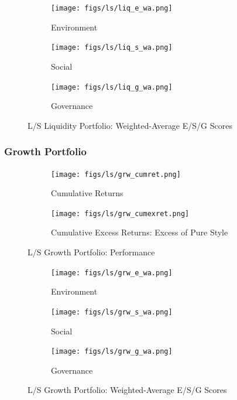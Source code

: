 \documentclass[11pt,a4paper]{article}
\begin{document}
\begin{figure}[h!]
    \centering
    \begin{subfigure}{.33\textwidth}
        \centering
        \texttt{[image: figs/ls/liq\_e\_wa.png]}
        \caption{Environment}
        \label{fig:liq_e_wa}
    \end{subfigure}%
    \begin{subfigure}{.33\textwidth}
      \centering
      \texttt{[image: figs/ls/liq\_s\_wa.png]}
      \caption{Social}
      \label{fig:liq_s_wa}
    \end{subfigure}%
    \begin{subfigure}{.33\textwidth}
        \centering
        \texttt{[image: figs/ls/liq\_g\_wa.png]}
        \caption{Governance}
        \label{fig:liq_g_wa}
      \end{subfigure}
    \caption{L/S Liquidity Portfolio: Weighted-Average E/S/G Scores}
\end{figure}

\begin{center}
    
    \label{tab:liq_stats}
\end{center}

\clearpage

\subsubsection{Growth Portfolio}

\begin{figure}[h!]
    \centering
    \begin{subfigure}{.5\textwidth}
        \centering
        \texttt{[image: figs/ls/grw\_cumret.png]}
        \caption{Cumulative Returns}
        \label{fig:grw_cumret}
    \end{subfigure}%
    \begin{subfigure}{.5\textwidth}
      \centering
      \texttt{[image: figs/ls/grw\_cumexret.png]}
      \caption{Cumulative Excess Returns: Excess of Pure Style}
      \label{fig:grw_cumexret}
    \end{subfigure}
    \caption{L/S Growth Portfolio: Performance}
\end{figure}

\begin{figure}[h!]
    \centering
    \begin{subfigure}{.33\textwidth}
        \centering
        \texttt{[image: figs/ls/grw\_e\_wa.png]}
        \caption{Environment}
        \label{fig:grw_e_wa}
    \end{subfigure}%
    \begin{subfigure}{.33\textwidth}
      \centering
      \texttt{[image: figs/ls/grw\_s\_wa.png]}
      \caption{Social}
      \label{fig:grw_s_wa}
    \end{subfigure}%
    \begin{subfigure}{.33\textwidth}
        \centering
        \texttt{[image: figs/ls/grw\_g\_wa.png]}
        \caption{Governance}
        \label{fig:grw_g_wa}
      \end{subfigure}
    \caption{L/S Growth Portfolio: Weighted-Average E/S/G Scores}
\end{figure}

\begin{center}
    
    \label{tab:grw_stats}
\end{center}
\end{document}

